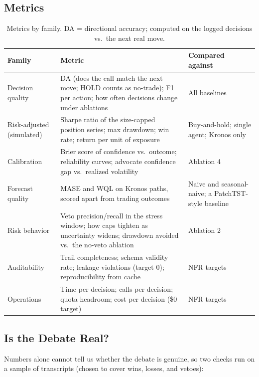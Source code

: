 \documentclass[conference]{IEEEtran}
\begin{document}
\subsection{Metrics}
\label{sec:eval-metrics}

\begin{table}[!t]
\centering
\caption{Metrics by family. DA = directional accuracy; computed on the logged decisions vs.\ the next real move.}
\label{tab:metrics}
\small
\begin{tabularx}{\columnwidth}{L{1.9cm} X L{1.35cm}}
\toprule
\textbf{Family} & \textbf{Metric} & \textbf{Compared against} \\
\midrule
Decision quality & DA (does the call match the next move; HOLD counts as no-trade); F1 per action; how often decisions change under ablations & All baselines \\
\addlinespace[2pt]
Risk-adjusted (simulated) & Sharpe ratio \cite{sharpe1994sharpe} of the size-capped position series; max drawdown; win rate; return per unit of exposure & Buy-and-hold; single agent; Kronos only \\
\addlinespace[2pt]
Calibration & Brier score of confidence vs.\ outcome; reliability curves; advocate confidence gap vs.\ realized volatility & Ablation 4 \\
\addlinespace[2pt]
Forecast quality & MASE \cite{hyndman2006another} and WQL on Kronos paths, scored apart from trading outcomes & Naive and seasonal-naive; a PatchTST-style baseline \cite{nie2023patchtst} \\
\addlinespace[2pt]
Risk behavior & Veto precision/recall in the stress window; how caps tighten as uncertainty widens; drawdown avoided vs.\ the no-veto ablation & Ablation 2 \\
\addlinespace[2pt]
Auditability & Trail completeness; schema validity rate; leakage violations (target 0); reproducibility from cache & NFR targets \\
\addlinespace[2pt]
Operations & Time per decision; calls per decision; quota headroom; cost per decision (\$0 target) & NFR targets \\
\bottomrule
\end{tabularx}
\end{table}

\subsection{Is the Debate Real?}

Numbers alone cannot tell us whether the debate is genuine, so two checks run on a sample of transcripts (chosen to cover wins, losses, and vetoes):
\end{document}
